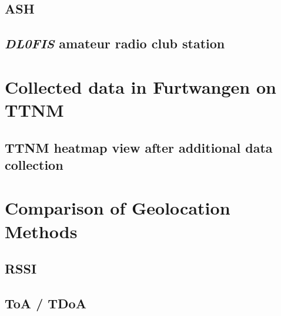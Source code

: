 \subsection{\acf{ASH}}


\subsection{\emph{DL0FIS} amateur radio club station}


\section{Collected data in Furtwangen on \acl{TTNM}}\label{sec:collected-data-in-furtwangen-on-ttnm}



\subsection{\acl{TTNM} heatmap view after additional data collection}\label{sec:ttm_heatmap_after}


\section{Comparison of Geolocation Methods}


\subsection{\acf{RSSI}}


\subsection{\acf{ToA} / \acf{TDoA}}


